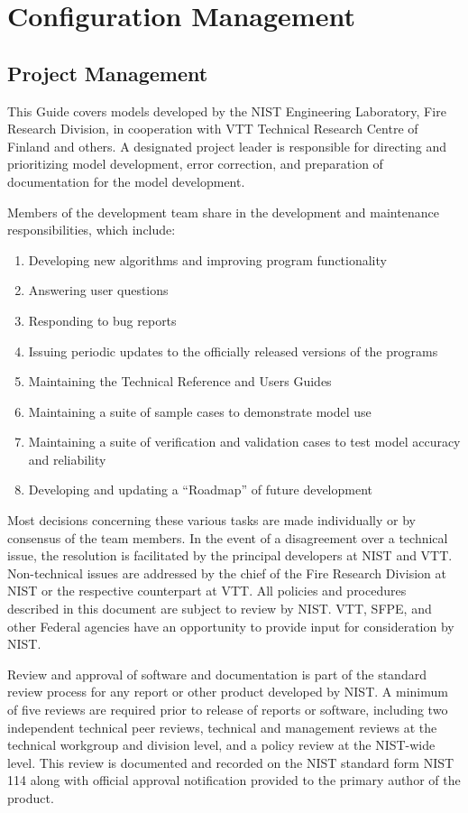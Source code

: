 \documentclass[11pt]{book}
\begin{document}
\chapter{Configuration Management}

\section{Project Management}

This Guide covers models developed by the NIST Engineering Laboratory, Fire Research Division, in cooperation with VTT Technical Research Centre of Finland and others. A designated project leader is responsible for directing and prioritizing model development, error correction, and preparation of documentation for the model development.

Members of the development team share in the development and maintenance responsibilities, which include:
\begin{enumerate}
\item Developing new algorithms and improving program functionality
\item Answering user questions
\item Responding to bug reports
\item Issuing periodic updates to the officially released versions of the programs
\item Maintaining the Technical Reference and Users Guides
\item Maintaining a suite of sample cases to demonstrate model use
\item Maintaining a suite of verification and validation cases to test model accuracy and reliability
\item Developing and updating a ``Roadmap'' of future development
\end{enumerate}
Most decisions concerning these various tasks are made individually or by consensus of the team members. In the event of a disagreement over a technical issue, the resolution is facilitated by the principal developers at NIST and VTT. Non-technical issues are addressed by the chief of the Fire Research Division at NIST or the respective counterpart at VTT. All policies and procedures described in this document are subject to review by NIST. VTT, SFPE, and other Federal agencies have an opportunity to provide input for consideration by NIST.

Review and approval of software and documentation is part of the standard review process for any report or other product developed by NIST. A minimum of five reviews are required prior to release of reports or software, including two independent technical peer reviews, technical and management reviews at the technical workgroup and division level, and a policy review at the NIST-wide level.  This review is documented and recorded on the NIST standard form NIST 114 along with official approval notification provided to the primary author of the product.
\end{document}
